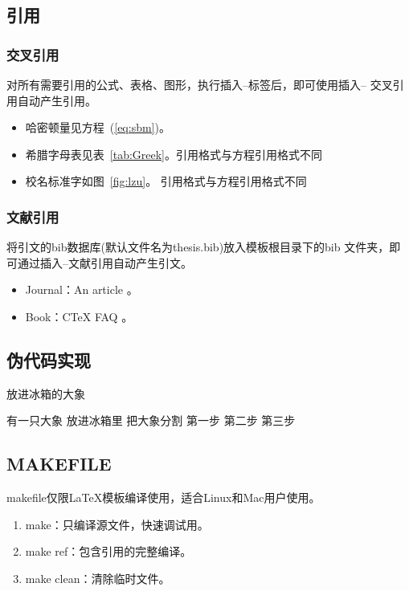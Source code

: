 \documentclass{LZUthesis}
\begin{document}
\subsection{引用}
\subsubsection{交叉引用}

对所有需要引用的公式、表格、图形，执行插入--标签后，即可使用插入-- 交叉引用自动产生引用。
\begin{itemize}
\item 哈密顿量见方程~(\ref{eq:sbm})。
\item 希腊字母表见表~\ref{tab:Greek}。引用格式与方程引用格式不同
\item 校名标准字如图~\ref{fig:lzu}。 引用格式与方程引用格式不同
\end{itemize}


\subsubsection{文献引用}

将引文的bib数据库(默认文件名为thesis.bib)放入模板根目录下的bib 文件夹，即可通过插入--文献引用自动产生引文。
\begin{itemize}
\item Journal：An article \cite{Liu13PRA-A}。
\item Book：C\TeX{} FAQ \cite{Wu05-C}。
\end{itemize}

\subsection{伪代码实现}

\begin{algorithm}
  \caption{放进冰箱的大象}
  \label{算法实例}
  \begin{algorithmic}
  \REQUIRE 有一只大象
  \ENSURE 放进冰箱里
     \STATE 把大象分割
        \ENDIF
    \ENDFOR
   \STATE 第一步
  \STATE 第二步
  \STATE 第三步
  \end{algorithmic}
\end{algorithm}


\subsection{MAKEFILE}

makefile仅限\LaTeX{}模板编译使用，适合Linux和Mac用户使用。
\begin{enumerate}
\item make：只编译源文件，快速调试用。
\item make ref：包含引用的完整编译。
\item make clean：清除临时文件。
\end{enumerate}
\end{document}
